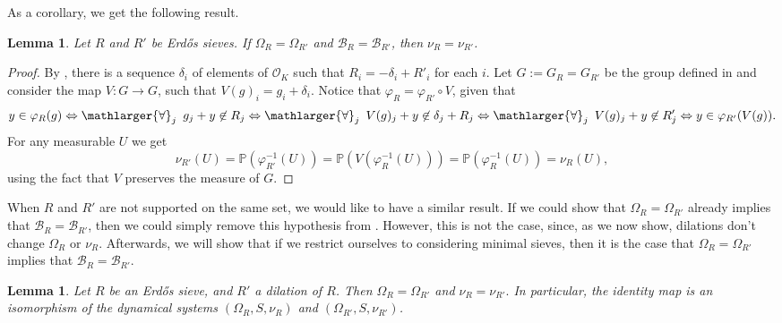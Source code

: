 \documentclass[a4paper,11pt,reqno]{amsart}
\theoremstyle{plain}
\newtheorem{lemma}[theorem]{Lemma}
\theoremstyle{remark}
\newcommand{\cb}{\mathcal{B}}
\newcommand{\co}{\mathcal{O}}
\newcommand{\mmp}{\mathbb{P}}
\begin{document}
			
			As a corollary, we get the following result.
			
			\begin{lemma}
				\label{lm: OmegaR = OmegaR' implies same meausre same base}
				Let $R$ and $R'$ be Erdős sieves. If $\Omega_R = \Omega_{R'}$ and $\cb_R = \cb_{R'}$, then $\nu_R = \nu_{R'}$.
			\end{lemma}
			\begin{proof} 
				
				By  , there is a sequence $\delta_i$ of elements of $\co_K$ such that $R_i = -\delta_i + R'_i$ for each $i$. Let $G := G_R = G_{R'}$ be the group defined in  and consider the map $V:G \rightarrow G$, such that $V(g)_i = g_i+\delta_i$. Notice that $\varphi_R = \varphi_{R'} \circ V$, given that $$y \in \varphi_R(g) \Leftrightarrow \mathlarger{\forall}_j \hspace{5pt} g_j + y \not \in R_j \Leftrightarrow \mathlarger{\forall}_j \hspace{5pt} V(g)_j + y \not \in \delta_j + R_j \Leftrightarrow \mathlarger{\forall}_j\hspace{5pt} V(g)_j + y \not \in R'_j  \Leftrightarrow  y \in \varphi_{R'}(V(g)). $$ 
				For any measurable $U$ we get  $$\nu_{R'}(U) = \mmp(\varphi_{R'}^{-1}(U)) = \mmp(V(\varphi_{R}^{-1}(U))) = \mmp(\varphi_{R}^{-1}(U)) = \nu_R(U),$$ using the fact that $V$ preserves the measure of $G$.
			\end{proof}
			
			
			When $R$ and $R'$ are not supported on the same set, we would like to have a similar result. If we could show that $\Omega_R = \Omega_{R'}$ already implies that $\cb_R = \cb_{R'}$, then we could simply remove this hypothesis from . However, this is not the case, since, as we now show, dilations don't change $\Omega_R$ or $\nu_R$. Afterwards, we will show that if we restrict ourselves to considering minimal sieves, then it is the case that $\Omega_R = \Omega_{R'}$ implies that $\cb_R = \cb_{R'}$.
			
			\begin{lemma}
				\label{lm: isomorphism of dynamical systems for contraction dilation}
				Let $R$ be an Erdős sieve, and $R'$ a dilation of $R$. Then $\Omega_R = \Omega_{R'}$ and $\nu_R = \nu_{R'}.$ In particular, the identity map is an isomorphism of the dynamical systems $(\Omega_{R},S,\nu_{R})$ and $(\Omega_{R'},S,\nu_{R'})$.
			\end{lemma}
			
\end{document}
